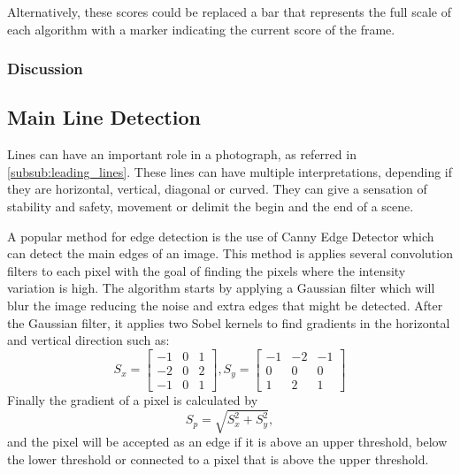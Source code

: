 
Alternatively, these scores could be replaced a bar that represents the full scale of each algorithm with a marker indicating the current score of the frame.


\subsubsection{Discussion}



\subsection{Main Line Detection}
\label{sub:line_detection}

Lines can have an important role in a photograph, as referred in \ref{subsub:leading_lines}. These lines can have multiple interpretations, depending if they are horizontal, vertical, diagonal or curved. They can give a sensation of stability and safety, movement or delimit the begin and the end of a scene.

A popular method for edge detection is the use of Canny Edge Detector\cite{canny1986computational} which can detect the main edges of an image. This method is applies several convolution filters to each pixel with the goal of finding the pixels where the intensity variation is high\cite{nobrega2013interactive}.
The algorithm starts by applying a Gaussian filter which will blur the image reducing the noise and extra edges that might be detected. After the Gaussian filter, it applies two Sobel kernels to find gradients in the horizontal and vertical direction such as:
\begin{equation}
S_{x} =
\begin{bmatrix}
	-1 & 0 & 1\\
	-2 & 0 & 2\\
	-1 & 0 & 1
\end{bmatrix}
,
S_{y} = 
\begin{bmatrix}
	-1 & -2 & -1\\
	0 & 0 & 0\\
	1 & 2 & 1
\end{bmatrix}
\end{equation}
Finally the gradient of a pixel is calculated by
\begin{equation}
	S_{p} = \sqrt{S_{x}^{2} + S_{y}^{2}},
\end{equation}
and the pixel will be accepted as an edge if it is above an upper threshold, below the lower threshold or connected to a pixel that is above the upper threshold.

